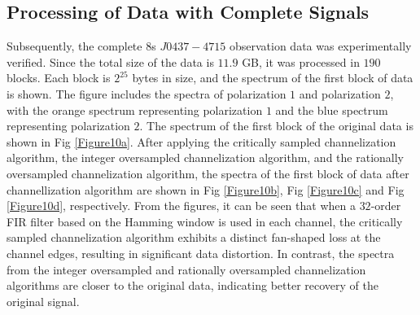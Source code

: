 \documentclass[referee]{raa}
\begin{document}


\subsection{Processing of Data with Complete Signals}

Subsequently, the complete $8$s $J0437-4715$ observation data was experimentally verified. Since the total size of the data is $11.9$ GB, it was processed in $190$ blocks. Each block is $2^{25}$ bytes in size, and the spectrum of the first block of data is shown. The figure includes the spectra of polarization $1$ and polarization $2$, with the orange spectrum representing polarization $1$ and the blue spectrum representing polarization $2$. The spectrum of the first block of the original data is shown in Fig \ref{Figure10a}. After applying the critically sampled channelization algorithm, the integer oversampled channelization algorithm, and the rationally oversampled channelization algorithm, the spectra of the first block of data after channellization algorithm are shown in Fig \ref{Figure10b}, Fig \ref{Figure10c} and Fig \ref{Figure10d}, respectively. From the figures, it can be seen that when a $32$-order FIR filter based on the Hamming window is used in each channel, the critically sampled channelization algorithm exhibits a distinct fan-shaped loss at the channel edges, resulting in significant data distortion. In contrast, the spectra from the integer oversampled and rationally oversampled channelization algorithms are closer to the original data, indicating better recovery of the original signal.
\end{document}
